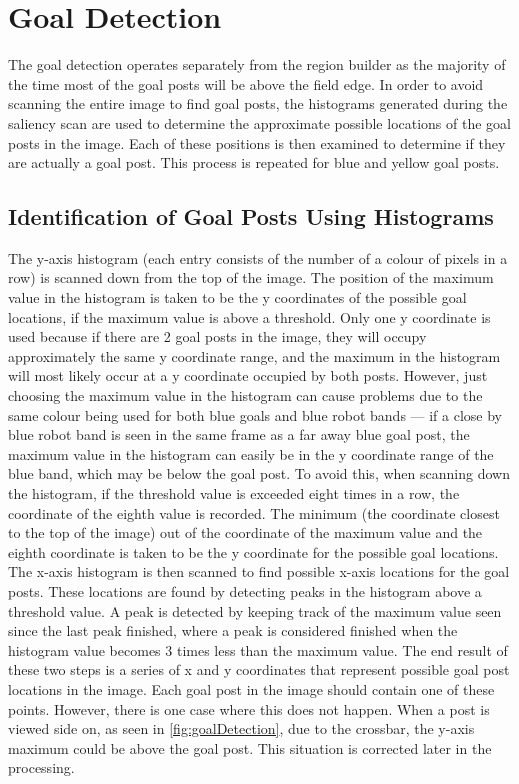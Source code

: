 \documentclass[pdftex,11pt,a4paper]{report}
\begin{document}
\section{Goal Detection}
The goal detection operates separately from the region builder as the majority of the time most of the goal posts will be above the field edge. In order to avoid scanning the entire image to find goal posts, the histograms generated during the saliency scan are used to determine the approximate possible locations of the goal posts in the image. Each of these positions is then examined to determine if they are actually a goal post. This process is repeated for blue and yellow goal posts.

\subsection{Identification of Goal Posts Using Histograms}

The y-axis histogram (each entry consists of the number of a colour of pixels in a row) is scanned down from the top of the image. The position of the maximum value in the histogram is taken to be the y coordinates of the possible goal locations, if the maximum value is above a threshold. Only one y coordinate is used because if there are 2 goal posts in the image, they will occupy approximately the same y coordinate range, and the maximum in the histogram will most likely occur at a y coordinate occupied by both posts. However, just choosing the maximum value in the histogram can cause problems due to the same colour being used for both blue goals and blue robot bands --- if a close by blue robot band is seen in the same frame as a far away blue goal post, the maximum value in the histogram can easily be in the y coordinate range of the blue band, which may be below the goal post. To avoid this, when scanning down the histogram, if the threshold value is exceeded eight times in a row, the coordinate of the eighth value is recorded. The minimum (the coordinate closest to the top of the image) out of the coordinate of the maximum value and the eighth coordinate is taken to be the y coordinate for the possible goal locations.
The x-axis histogram is then scanned to find possible x-axis locations for the goal posts. These locations are found by detecting peaks in the histogram above a threshold value. A peak is detected by keeping track of the maximum value seen since the last peak finished, where a peak is considered finished when the histogram value becomes 3 times less than the maximum value. The end result of these two steps is a series of x and y coordinates that represent possible goal post locations in the image. Each goal post in the image should contain one of these points.  However, there is one case where this does not happen. When a post is viewed side on, as seen in \autoref{fig:goalDetection}, due to the crossbar, the y-axis maximum could be above the goal post. This situation is corrected later in the processing.
\end{document}
